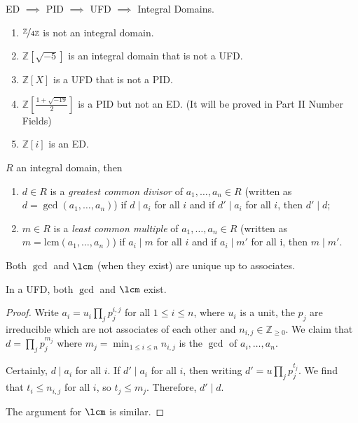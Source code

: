 \begin{example}
    ED \(\implies\) PID \(\implies\) UFD \(\implies\) Integral Domains.
    \begin{enumerate}
        \item \(\nicefrac{\mathbb{Z}}{4\mathbb{Z}}\) is not an integral domain.
        \item \(\mathbb{Z}[\sqrt{-5}]\) is an integral domain that is not a UFD.
        \item \(\mathbb{Z}[X]\) is a UFD that is not a PID.
        \item \(\mathbb{Z}[\frac{1 + \sqrt{-19} }{2}]\) is a PID but not an ED. (It will be proved in Part II Number Fields)
        \item \(\mathbb{Z}[i]\) is an ED.
    \end{enumerate} 
    \begin{definition}{}{}
        \(R\) an integral domain, then
        \begin{enumerate}
            \item \(d \in R\) is a \textit{greatest common divisor} of \(a_1, \ldots,a_n \in R\) (written as \(d = \gcd(a_1, \ldots, a_n)\)) if \(d \mid a_i\) for all \(i\) and if \(d' \mid a_i\) for all \(i\), then \(d'\mid d\);
            \item \(m \in R\) is a \textit{least common multiple} of \(a_1, \ldots,a_n \in R\) (written as \(m = \mathrm{lcm}(a_1, \ldots,a_n)\)) if \(a_i \mid m\) for all \(i\) and if \(a_i \mid m'\) for all i, then \(m \mid m'\).
        \end{enumerate}
        Both \(\gcd\) and \(\lcm\) (when they exist) are unique up to associates.
    \end{definition}
\end{example}
\begin{proposition}{}{}
    In a UFD, both \(\gcd\) and \(\lcm\) exist.
\end{proposition}
\begin{proof}
    Write \(a_i = u_i \prod\limits_{j}p_j^{i,j}\) for all \(1 \leq i \leq n\), where \(u_i\) is a unit, the \(p_j\) are irreducible which are not associates of each other and \(n_{i,j} \in \mathbb{Z}_{\geq 0}\). We claim that \(d = \prod_j p_j ^{m_j}\) where \(m_j = \mathop{\min}_{1\leq i\leq n}n_{i,j}\) is the \(\gcd\) of \(a_i, \ldots, a_n\).

    Certainly, \(d \mid a_i\) for all \(i\). If \(d' \mid a_{i}\) for all \(i\), then writing \(d' = u \prod_j p_j^{t_j}\). We find that \(t_i \leq n_{i,j}\) for all \(i\), so \(t_j \leq m_j\). Therefore, \(d' \mid d\).

    The argument for \(\lcm\) is similar.
\end{proof}